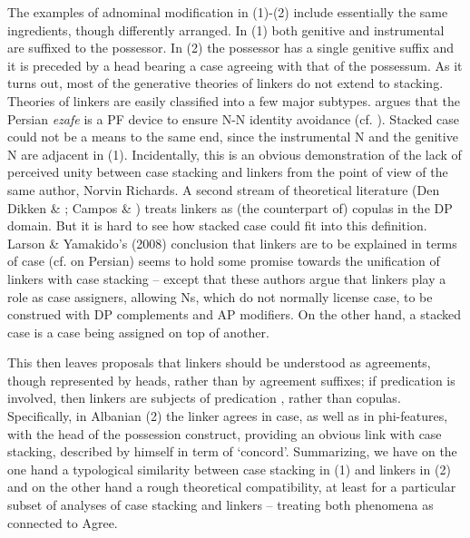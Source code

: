 \documentclass[output=paper]{langsci/langscibook}
\begin{document}
\begin{styleSfondomedioiColorexxi}
The examples of adnominal modification in (1)-(2) include essentially the same ingredients, though differently arranged. In (1) both genitive and instrumental are suffixed to the possessor. In (2) the possessor has a single genitive suffix and it is preceded by a head bearing a case agreeing with that of the possessum. As it turns out, most of the generative theories of linkers do not extend to stacking. Theories of linkers are easily classified into a few major subtypes. \citet{Richards2010} argues that the Persian \textit{ezafe} is a PF device to ensure N-N identity avoidance (cf. \citealt{Ghomeshi1997}). Stacked case could not be a means to the same end, since the instrumental N and the genitive N are adjacent in (1). Incidentally, this is an obvious demonstration of the lack of perceived unity between case stacking and linkers from the point of view of the same author, Norvin Richards. A second stream of theoretical literature (Den Dikken \& \citealt{Singhapreecha2004}; Campos \& \citealt{Stavrou2005}) treats linkers as (the counterpart of) copulas in the DP domain. But it is hard to see how stacked case could fit into this definition. Larson \& Yamakido’s (2008) conclusion that linkers are to be explained in terms of case (cf. \citealt{Samiian1994} on Persian) seems to hold some promise towards the unification of linkers with case stacking – except that these authors argue that linkers play a role as case assigners, allowing Ns, which do not normally license case, to be construed with DP complements and AP modifiers. On the other hand, a stacked case is a case being assigned on top of another. 
\end{styleSfondomedioiColorexxi}

\begin{styleSfondomedioiColorexxi}
This then leaves proposals \citep{Philip2012} that linkers should be understood as agreements, though represented by heads, rather than by agreement suffixes; if predication is involved, then linkers are subjects of predication \citep{FrancoEtAl2015}, rather than copulas. Specifically, in Albanian (2) the linker agrees in case, as well as in phi-features, with the head of the possession construct, providing an obvious link with case stacking, described by \citet{Richards2013} himself in term of ‘concord’. Summarizing, we have on the one hand a typological similarity between case stacking in (1) and linkers in (2) and on the other hand a rough theoretical compatibility, at least for a particular subset of analyses of case stacking and linkers – treating both phenomena as connected to Agree. 
\end{styleSfondomedioiColorexxi}
\end{document}

